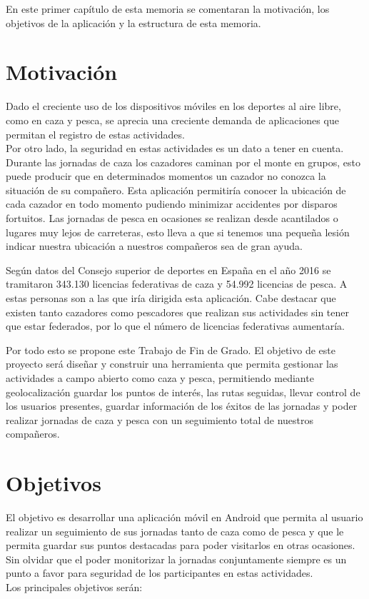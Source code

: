En este primer capítulo de esta memoria se comentaran la motivación, los objetivos de la aplicación y la estructura de esta memoria. 
\section{Motivación}
Dado el creciente uso de los dispositivos móviles en los deportes al aire libre, como en caza y pesca, se aprecia una creciente demanda de aplicaciones que permitan el registro de estas actividades.\\
Por otro lado, la seguridad en estas actividades es un dato a tener en cuenta. Durante las jornadas de caza los cazadores caminan por el monte en grupos, esto puede producir que en determinados momentos un cazador no conozca la situación de su compañero.
Esta aplicación permitiría conocer la ubicación de cada cazador en todo momento pudiendo minimizar accidentes por disparos fortuitos. Las jornadas de pesca en ocasiones  se realizan desde acantilados o lugares muy lejos de carreteras, esto lleva a que si tenemos una pequeña lesión indicar nuestra ubicación a nuestros compañeros sea de gran ayuda.

Según datos del Consejo superior de deportes en España en el año 2016 se tramitaron 343.130 licencias federativas de caza y 54.992 licencias de pesca. A estas personas son a las que iría dirigida esta aplicación. Cabe destacar que existen tanto cazadores como pescadores que realizan sus actividades sin tener que estar federados, por lo que el número de licencias federativas aumentaría. 





Por todo esto se propone este Trabajo de Fin de Grado.
El objetivo de este proyecto será diseñar y construir una herramienta que permita gestionar las actividades a campo abierto como
caza y pesca, permitiendo mediante geolocalización guardar los puntos de interés, las rutas seguidas,
llevar control de los usuarios presentes, guardar información de los éxitos de las jornadas y poder realizar jornadas de caza y pesca con un seguimiento  total de nuestros compañeros.


\section{Objetivos}
El objetivo es desarrollar una aplicación móvil en Android que permita al usuario realizar un seguimiento de sus jornadas tanto de caza como de pesca  y que le permita guardar sus puntos destacadas para poder visitarlos en otras ocasiones. Sin olvidar que el poder monitorizar la jornadas conjuntamente siempre es un punto a favor para seguridad de los participantes en estas actividades.\\ Los principales objetivos serán:


